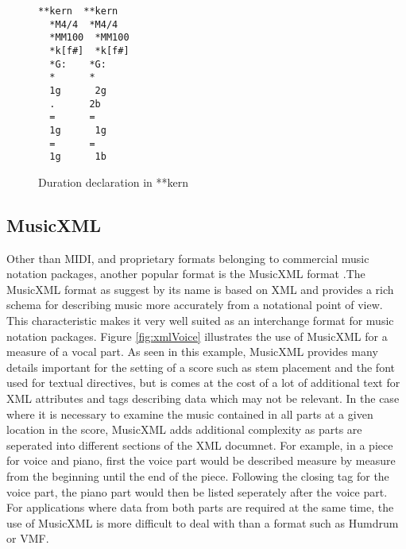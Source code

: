 \begin{figure}
  \begin{center}
    \begin{Verbatim}[fontfamily=courier, xleftmargin=\parindent]
  **kern  **kern
  *M4/4  *M4/4
  *MM100  *MM100
  *k[f#]  *k[f#]
  *G:    *G:
  *      *
  1g      2g
  .      2b
  =      =
  1g      1g
  =      =
  1g      1b
    \end{Verbatim}
    \caption{Duration declaration in **kern}
    \label{fig:humdrumDuration}
  \end{center}
\end{figure}

\subsection{MusicXML}

Other than MIDI, and proprietary formats belonging to commercial music notation packages, another popular format is the MusicXML format \citep*{Good10}.The MusicXML format as suggest by its name is based on XML and provides a rich schema for describing music more accurately from a notational point of view. This characteristic makes it very well suited as an interchange format for music notation packages. Figure \ref{fig:xmlVoice} illustrates the use of MusicXML for a measure of a vocal part. As seen in this example, MusicXML provides many details important for the setting of a score such as stem placement and the font used for textual directives, but is comes at the cost of a lot of additional text for XML attributes and tags describing data which may not be relevant. In the case where it is necessary to examine the music contained in all parts at a given location in the score, MusicXML adds additional complexity as parts are seperated into different sections of the XML documnet. For example, in a piece for voice and piano, first the voice part would be described measure by measure from the beginning until the end of the piece. Following the closing tag for the voice part, the piano part would then be listed seperately after the voice part. For applications where data from both parts are required at the same time, the use of MusicXML is more difficult to deal with than a format such as Humdrum or VMF.


